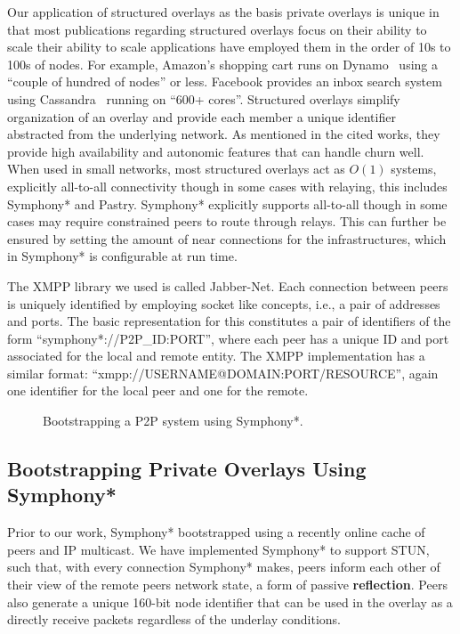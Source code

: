 \documentclass[conference]{IEEEtran}
\begin{document}
Our application of structured overlays as the basis private overlays is unique
in that most publications regarding structured overlays focus on their ability
to scale their ability to scale applications have employed them in the order of
10s to 100s of nodes.  For example, Amazon's shopping cart runs on
Dynamo~\cite{dynamo} using a ``couple of hundred of nodes'' or less.  Facebook
provides an inbox search system using Cassandra~\cite{cassandra} running on
``600+ cores''.  Structured overlays simplify organization of an overlay and
provide each member a unique identifier abstracted from the underlying network.
As mentioned in the cited works, they provide high availability and autonomic
features that can handle churn well.  When used in small networks, most
structured overlays act as $O(1)$ systems, explicitly all-to-all connectivity
though in some cases with relaying, this includes Symphony* and Pastry.  Symphony*
explicitly supports all-to-all though in some cases may require constrained
peers to route through relays.  This can further be ensured by setting the
amount of near connections for the infrastructures, which in Symphony* is
configurable at run time.

The XMPP library we used is called Jabber-Net.  Each connection between peers
is uniquely identified by employing socket like concepts, i.e., a pair of
addresses and ports.  The basic representation for this constitutes a pair of
identifiers of the form ``symphony*://P2P\_ID:PORT'', where each peer has a unique
ID and port associated for the local and remote entity.  The XMPP
implementation has a similar format: ``xmpp://USERNAME@DOMAIN:PORT/RESOURCE'',
again one identifier for the local peer and one for the remote.

\begin{figure*}[h!t!]
\centering
{}
\caption{Bootstrapping a P2P system using Symphony*.}
\label{fig:bootstrap_brunet}
\end{figure*}

\subsection{Bootstrapping Private Overlays Using Symphony*}
\label{brunet_bootstrapping}

Prior to our work, Symphony* bootstrapped using a recently online cache of peers
and IP multicast.  We have implemented Symphony* to support STUN, such that, with
every connection Symphony* makes, peers inform each other of their view of the
remote peers network state, a form of passive \textbf{reflection}.  Peers also
generate a unique 160-bit node identifier that can be used in the overlay as a
directly receive packets regardless of the underlay conditions.
\end{document}
